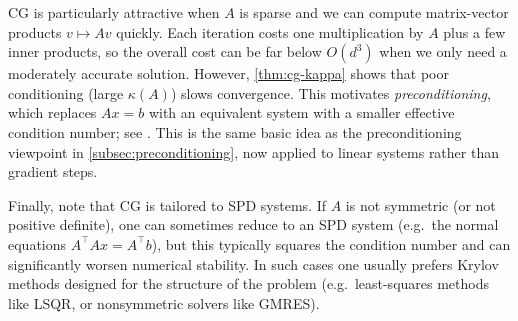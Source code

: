 CG is particularly attractive when $A$ is sparse and we can compute matrix-vector products $v\mapsto Av$ quickly.
Each iteration costs one multiplication by $A$ plus a few inner products, so the overall cost can be far below $O(d^3)$ when we only need a moderately accurate solution.
However, \cref{thm:cg-kappa} shows that poor conditioning (large $\kappa(A)$) slows convergence.
This motivates \emph{preconditioning}, which replaces $Ax=b$ with an equivalent system with a smaller effective condition number; see \citet[\S5.1]{nocedal_wright_2006_numerical}.
This is the same basic idea as the preconditioning viewpoint in \cref{subsec:preconditioning}, now applied to linear systems rather than gradient steps.

Finally, note that CG is tailored to SPD systems.
If $A$ is not symmetric (or not positive definite), one can sometimes reduce to an SPD system (e.g.\ the normal equations $A^\top A x = A^\top b$), but this typically squares the condition number and can significantly worsen numerical stability.
In such cases one usually prefers Krylov methods designed for the structure of the problem (e.g.\ least-squares methods like LSQR, or nonsymmetric solvers like GMRES).
